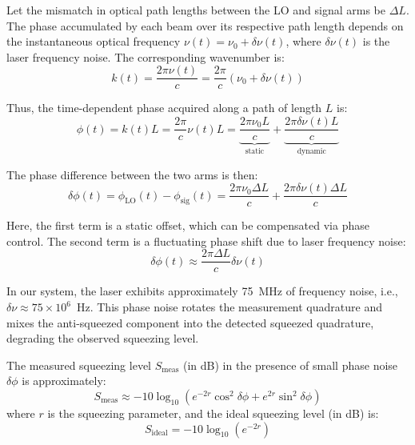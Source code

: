 \documentclass[colorlinks=true,pdfstartview=FitV,linkcolor=blue,
citecolor=red,urlcolor=magenta]{ligodoc}
\begin{document}
Let the mismatch in optical path lengths between the LO and signal arms be \( \Delta L \). The phase accumulated by each beam over its respective path length depends on the instantaneous optical frequency \( \nu(t) = \nu_0 + \delta \nu(t) \), where \( \delta \nu(t) \) is the laser frequency noise. The corresponding wavenumber is:
\begin{equation}
    k(t) = \frac{2\pi \nu(t)}{c} = \frac{2\pi}{c} (\nu_0 + \delta \nu(t))
\end{equation}

Thus, the time-dependent phase acquired along a path of length \( L \) is:
\begin{equation}
    \phi(t) = k(t) L = \frac{2\pi}{c} \nu(t) L = \underbrace{\frac{2\pi \nu_0 L}{c}}_{\text{static}} + \underbrace{\frac{2\pi \delta \nu(t) L}{c}}_{\text{dynamic}}
\end{equation}

The phase difference between the two arms is then:
\begin{equation}
    \delta \phi(t) = \phi_{\text{LO}}(t) - \phi_{\text{sig}}(t) = \frac{2\pi \nu_0 \Delta L}{c} + \frac{2\pi \delta \nu(t) \Delta L}{c}
\end{equation}

Here, the first term is a static offset, which can be compensated via phase control. The second term is a fluctuating phase shift due to laser frequency noise:
\begin{equation}
    \delta \phi(t) \approx \frac{2\pi \Delta L}{c} \delta \nu(t)
\end{equation}

In our system, the laser exhibits approximately 75~MHz of frequency noise, i.e., \( \delta \nu \approx 75 \times 10^6 \)~Hz. This phase noise rotates the measurement quadrature and mixes the anti-squeezed component into the detected squeezed quadrature, degrading the observed squeezing level.

The measured squeezing level \( S_{\text{meas}} \) (in dB) in the presence of small phase noise \( \delta \phi \) is approximately:
\begin{equation}
    S_{\text{meas}} \approx -10 \log_{10} \left( e^{-2r} \cos^2 \delta \phi + e^{2r} \sin^2 \delta \phi \right)
\end{equation}
where \( r \) is the squeezing parameter, and the ideal squeezing level (in dB) is:
\begin{equation}
    S_{\text{ideal}} = -10 \log_{10}(e^{-2r})
\end{equation}
\end{document}

